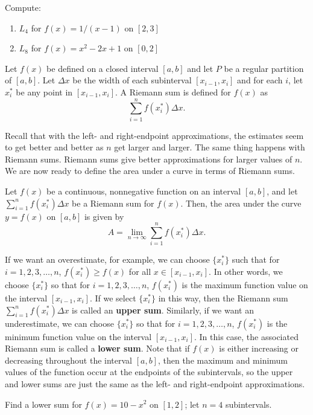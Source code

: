 \documentclass[12pt]{amsart}
\begin{document}
\begin{problem}
Compute:
\begin{enumerate}
	\item $L_4$ for $f(x) =  1/(x-1)$ on $[2,3]$
	      \vspace{7cm}
	\item $L_8$ for $f(x) =  x^2 - 2x + 1$ on $[0,2]$
	      \vspace{7cm}
\end{enumerate}
\end{problem}

\begin{definition}
	Let $f(x)$ be defined on a closed interval $[a,b]$ and let $P$ be a regular partition of $[a,b]$. Let $\Delta x$ be the width of each subinterval $[x_{i-1}, x_i]$ and for each $i$, let $x_i^*$ be any point in $[x_{i-1}, x_i]$. A Riemann sum is defined for $f(x)$ as
	\[\sum_{i=1}^n f(x_i^*)\Delta x.\]
\end{definition}

Recall that with the left- and right-endpoint approximations, the estimates seem to get better and better as $n$ get larger and larger. The same thing happens with Riemann sums. Riemann sums give better approximations for larger values of $n$. We are now ready to define the area under a curve in terms of Riemann sums.

\begin{definition}
	Let $f(x)$ be a continuous, nonnegative function on an interval $[a,b]$, and let $\sum_{i=1}^n f(x_i^*)\Delta x$ be a Riemann sum for $f(x)$. Then, the area under the curve $y=f(x)$ on $[a,b]$ is given by
	\[A = \lim_{n \to \infty} \sum_{i=1}^n f(x_i^*)\Delta x.\]
\end{definition}


If we want an overestimate, for example, we can choose $\{x_i^*\}$ such that for $i = 1,2,3,\ldots,n$, $f(x_i^*) \geq f(x)$ for all $x \in [x_{i-1}, x_i]$. In other words, we choose $\{x_i^*\}$ so that for $i = 1,2,3,\ldots,n$, $f(x_i^*)$ is the maximum function value on the interval $[x_{i-1}, x_i]$. If we select $\{x_i^*\}$ in this way, then the Riemann sum $\sum_{i=1}^n f(x_i^*)\Delta x$ is called an \textbf{upper sum}. Similarly, if we want an underestimate, we can choose $\{x_i^*\}$ so that for $i = 1,2,3,\ldots,n$, $f(x_i^*)$ is the minimum function value on the interval $[x_{i-1}, x_i]$. In this case, the associated Riemann sum is called a \textbf{lower sum}. Note that if $f(x)$ is either increasing or decreasing throughout the interval $[a,b]$, then the maximum and minimum values of the function occur at the endpoints of the subintervals, so the upper and lower sums are just the same as the left- and right-endpoint approximations.

\begin{problem}
Find a lower sum for $f(x) = 10-x^2$ on $[1,2]$; let $n = 4$ subintervals.
\vspace{7cm}
\end{problem}
\end{document}

